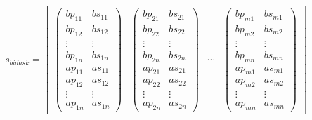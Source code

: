 \begin{equation}\label{eq:feature-bid-ask}
s_{bidask} =\begin{bmatrix}
{\displaystyle \begin{pmatrix}
bp_{11} & bs_{11}\\
bp_{12} & bs_{12}\\
\vdots  & \vdots \\
bp_{1n} & bs_{1n}\\
ap_{11} & as_{11}\\
ap_{12} & as_{12}\\
\vdots  & \vdots \\
ap_{1n} & as_{1n}
\end{pmatrix}} & \begin{pmatrix}
bp_{21} & bs_{21}\\
bp_{22} & bs_{22}\\
\vdots  & \vdots \\
bp_{2n} & bs_{2n}\\
ap_{21} & as_{21}\\
ap_{22} & as_{22}\\
\vdots  & \vdots \\
ap_{2n} & as_{2n}
\end{pmatrix} & \cdots  & \begin{pmatrix}
bp_{m1} & bs_{m1}\\
bp_{m2} & bs_{m2}\\
\vdots  & \vdots \\
bp_{mn} & bs_{mn}\\
ap_{m1} & as_{m1}\\
ap_{m2} & as_{m2}\\
\vdots  & \vdots \\
ap_{mn} & as_{mn}
\end{pmatrix}
\end{bmatrix} \ 
\end{equation}

